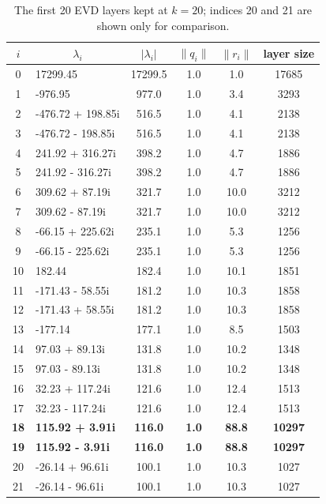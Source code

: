 \documentclass[12pt]{article}
\begin{document}
\begin{table}[H]
\centering
\footnotesize
\setlength{\tabcolsep}{5pt}
\begin{tabular}{clcccc}
\toprule
$i$ & \multicolumn{1}{c}{$\lambda_i$} & $|\lambda_i|$ & $\lVert q_i\rVert$ & $\lVert r_i\rVert$ & layer size \\
\midrule
0  & 17299.45          & 17299.5 & 1.0 & 1.0  & 17685 \\
1  & -976.95           & 977.0   & 1.0 & 3.4  & 3293  \\
2  & -476.72 + 198.85i & 516.5   & 1.0 & 4.1  & 2138  \\
3  & -476.72 - 198.85i & 516.5   & 1.0 & 4.1  & 2138  \\
4  & 241.92 + 316.27i  & 398.2   & 1.0 & 4.7  & 1886  \\
5  & 241.92 - 316.27i  & 398.2   & 1.0 & 4.7  & 1886  \\
6  & 309.62 + 87.19i   & 321.7   & 1.0 & 10.0 & 3212  \\
7  & 309.62 - 87.19i   & 321.7   & 1.0 & 10.0 & 3212  \\
8  & -66.15 + 225.62i  & 235.1   & 1.0 & 5.3  & 1256  \\
9  & -66.15 - 225.62i  & 235.1   & 1.0 & 5.3  & 1256  \\
10 & 182.44            & 182.4   & 1.0 & 10.1 & 1851  \\
11 & -171.43 - 58.55i  & 181.2   & 1.0 & 10.3 & 1858  \\
12 & -171.43 + 58.55i  & 181.2   & 1.0 & 10.3 & 1858  \\
13 & -177.14           & 177.1   & 1.0 & 8.5  & 1503  \\
14 & 97.03 + 89.13i    & 131.8   & 1.0 & 10.2 & 1348  \\
15 & 97.03 - 89.13i    & 131.8   & 1.0 & 10.2 & 1348  \\
16 & 32.23 + 117.24i   & 121.6   & 1.0 & 12.4 & 1513  \\
17 & 32.23 - 117.24i   & 121.6   & 1.0 & 12.4 & 1513  \\
\textbf{18} & \textbf{115.92 + 3.91i} & \textbf{116.0} & \textbf{1.0} & \textbf{88.8} & \textbf{10297} \\
\textbf{19} & \textbf{115.92 - 3.91i} & \textbf{116.0} & \textbf{1.0} & \textbf{88.8} & \textbf{10297} \\
\midrule
20 & -26.14 + 96.61i   & 100.1   & 1.0 & 10.3 & 1027  \\
21 & -26.14 - 96.61i   & 100.1   & 1.0 & 10.3 & 1027  \\
\bottomrule
\end{tabular}
\caption{The first 20 EVD layers kept at $k=20$; indices 20 and 21 are shown only for comparison.}
\end{table}
\end{document}
